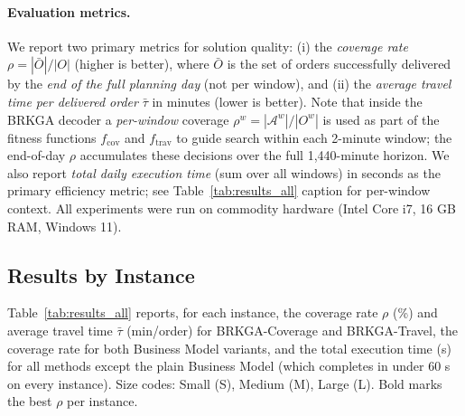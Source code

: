 \paragraph{Evaluation metrics.}
We report two primary metrics for solution quality:
(i) the \emph{coverage rate} $\rho = |\bar{O}|/|O|$ (higher is better),
where $\bar{O}$ is the set of orders successfully delivered by the
\emph{end of the full planning day} (not per window), and
(ii) the \emph{average travel time per delivered order} $\bar{\tau}$
in minutes (lower is better).
Note that inside the BRKGA decoder a \emph{per-window} coverage
$\rho^w = |\mathcal{A}^w|/|O^w|$ is used as part of the fitness
functions $f_{\text{cov}}$ and $f_{\text{trav}}$ to guide search
within each 2-minute window; the end-of-day $\rho$ accumulates these
decisions over the full 1,440-minute horizon.
We also report \emph{total daily execution time} (sum over all
windows) in seconds as the primary efficiency metric;
see Table~\ref{tab:results_all} caption for per-window context.
All experiments were run on commodity hardware
(Intel Core i7, 16 GB RAM, Windows 11).

\subsection{Results by Instance}\label{subsec:results_table}

Table~\ref{tab:results_all} reports, for each instance, the coverage
rate $\rho$ (\%) and average travel time $\bar{\tau}$ (min/order)
for BRKGA-Coverage and BRKGA-Travel, the coverage rate for both
Business Model variants, and the total execution time (s) for all
methods except the plain Business Model (which completes in under
60 s on every instance).
Size codes: Small (S), Medium (M), Large (L).
Bold marks the best $\rho$ per instance.

